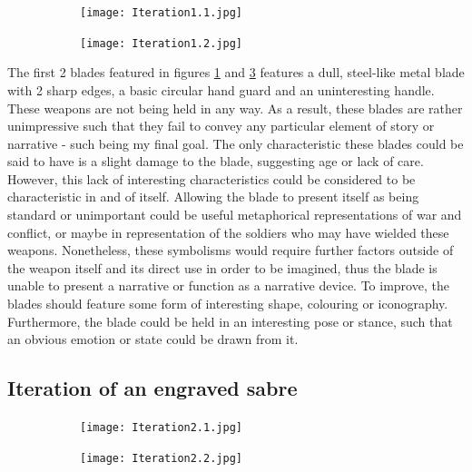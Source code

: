 \documentclass{article}
\begin{document}
\begin{figure}[h]
    \centering
    \caption{}
    \label{fig:Iteration1}
    \begin{subfigure}{0.49\textwidth}
        \texttt{[image: Iteration1.1.jpg]}
        \caption{}
        \label{fig:Iteration1.1}
    \end{subfigure}
    \begin{subfigure}{0.49\textwidth}
        \texttt{[image: Iteration1.2.jpg]}
        \caption{}
        \label{fig:Iteration1.2}
    \end{subfigure}
\end{figure}

The first 2 blades featured in figures \ref{fig:Iteration1.1} and \ref{fig:Iteration1.2} features a dull, steel-like metal blade with 2 sharp edges, a basic circular hand guard and an uninteresting handle. These weapons are not being held in any way. As a result, these blades are rather unimpressive such that they fail to convey any particular element of story or narrative - such being my final goal. The only characteristic these blades could be said to have is a slight damage to the blade, suggesting age or lack of care. However, this lack of interesting characteristics could be considered to be characteristic in and of itself. Allowing the blade to present itself as being standard or unimportant could be useful metaphorical representations of war and conflict, or maybe in representation of the soldiers who may have wielded these weapons. Nonetheless, these symbolisms would require further factors outside of the weapon itself and its direct use in order to be imagined, thus the blade is unable to present a narrative or function as a narrative device. To improve, the blades should feature some form of interesting shape, colouring or iconography. Furthermore, the blade could be held in an interesting pose or stance, such that an obvious emotion or state could be drawn from it.

\pagebreak

\subsection{Iteration of an engraved sabre} \label{Iteration2}

\begin{figure}[h]
    \centering
    \caption{}
    \label{fig:Iteration2}
    \begin{subfigure}{0.49\textwidth}
        \texttt{[image: Iteration2.1.jpg]}
        \caption{}
        \label{fig:Iteration2.1}
    \end{subfigure}
    \begin{subfigure}{0.49\textwidth}
        \texttt{[image: Iteration2.2.jpg]}
        \caption{}
        \label{fig:Iteration2.2}
    \end{subfigure}
\end{figure}
\end{document}

